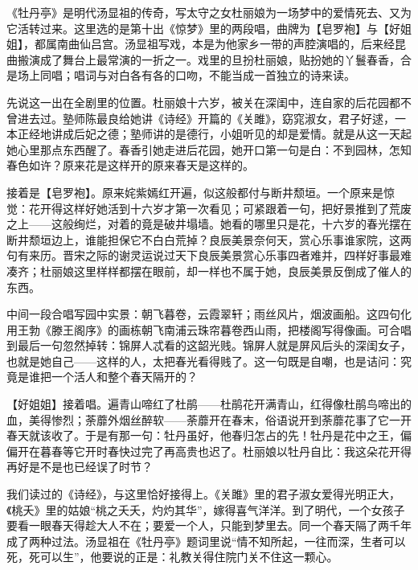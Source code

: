 \begin{appreciation}
《牡丹亭》是明代汤显祖的传奇，写太守之女杜丽娘为一场梦中的爱情死去、又为它活转过来。这里选的是第十出《惊梦》里的两段唱，曲牌为【皂罗袍】与【好姐姐】，都属南曲仙吕宫。汤显祖写戏，本是为他家乡一带的声腔演唱的，后来经昆曲搬演成了舞台上最常演的一折之一。戏里的旦扮杜丽娘，贴扮她的丫鬟春香，合是场上同唱；唱词与对白各有各的口吻，不能当成一首独立的诗来读。

先说这一出在全剧里的位置。杜丽娘十六岁，被关在深闺中，连自家的后花园都不曾进去过。塾师陈最良给她讲《诗经》开篇的《关雎》，窈窕淑女，君子好逑，一本正经地讲成后妃之德；塾师讲的是德行，小姐听见的却是爱情。就是从这一天起她心里那点东西醒了。春香引她走进后花园，她开口第一句是白：不到园林，怎知春色如许？原来花是这样开的原来春天是这样的。

接着是【皂罗袍】。原来姹紫嫣红开遍，似这般都付与断井颓垣。一个原来是惊觉：花开得这样好她活到十六岁才第一次看见；可紧跟着一句，把好景推到了荒废之上——这般绚烂，对着的竟是破井塌墙。她看的哪里只是花，十六岁的春光摆在断井颓垣边上，谁能担保它不白白荒掉？良辰美景奈何天，赏心乐事谁家院，这两句有来历。晋宋之际的谢灵运说过天下良辰美景赏心乐事四者难并，四样好事最难凑齐；杜丽娘这里样样都摆在眼前，却一样也不属于她，良辰美景反倒成了催人的东西。

中间一段合唱写园中实景：朝飞暮卷，云霞翠轩；雨丝风片，烟波画船。这四句化用王勃《滕王阁序》的画栋朝飞南浦云珠帘暮卷西山雨，把楼阁写得像画。可合唱到最后一句忽然掉转：锦屏人忒看的这韶光贱。锦屏人就是屏风后头的深闺女子，也就是她自己——这样的人，太把春光看得贱了。这一句既是自嘲，也是诘问：究竟是谁把一个活人和整个春天隔开的？

【好姐姐】接着唱。遍青山啼红了杜鹃——杜鹃花开满青山，红得像杜鹃鸟啼出的血，美得惨烈；荼蘼外烟丝醉软——荼蘼开在春末，俗语说开到荼蘼花事了它一开春天就该收了。于是有那一句：牡丹虽好，他春归怎占的先！牡丹是花中之王，偏偏开在暮春等它开时春快过完了再高贵也迟了。杜丽娘以牡丹自比：我这朵花开得再好是不是也已经误了时节？

我们读过的《诗经》，与这里恰好接得上。《关雎》里的君子淑女爱得光明正大，《桃夭》里的姑娘“桃之夭夭，灼灼其华”，嫁得喜气洋洋。到了明代，一个女孩子要看一眼春天得趁大人不在；要爱一个人，只能到梦里去。同一个春天隔了两千年成了两种过法。汤显祖在《牡丹亭》题词里说“情不知所起，一往而深，生者可以死，死可以生”，他要说的正是：礼教关得住院门关不住这一颗心。
\end{appreciation}
